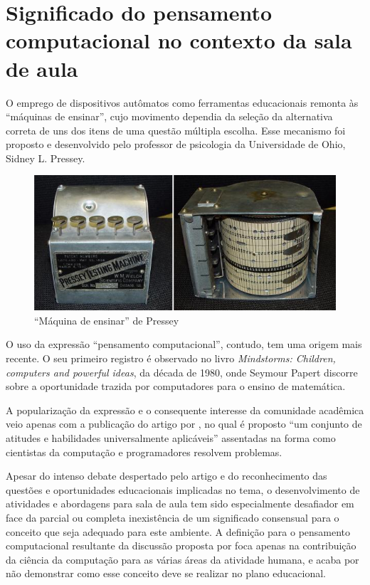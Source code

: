 \section{Significado do pensamento computacional no contexto da sala de aula}\label{significado-pensamento-computacional}

O emprego de dispositivos autômatos como ferramentas educacionais remonta às ``máquinas de ensinar'', cujo movimento dependia da seleção da alternativa correta de uns dos itens de uma questão múltipla escolha. Esse mecanismo foi proposto e desenvolvido pelo professor de psicologia da Universidade de Ohio,  Sidney L. Pressey.

\begin{figure}[!htb]
	\caption{``Máquina de ensinar'' de Pressey}
	\begin{center}
	    \includegraphics[scale=0.7]{imagens/pressey}
	\end{center}
	\label{fig:pressey}
\end{figure}

O uso da expressão ``pensamento computacional'', contudo, tem uma origem mais recente. O seu primeiro registro é observado no livro \textit{Mindstorms: Children, computers and powerful ideas}, da década de 1980, onde Seymour Papert discorre sobre a oportunidade trazida por computadores para o ensino de matemática. 

A popularização da expressão e o consequente interesse da comunidade acadêmica veio apenas com a publicação do artigo por , no qual é proposto ``um conjunto de atitudes e habilidades universalmente aplicáveis'' assentadas na forma como cientistas da computação e programadores resolvem problemas.

Apesar do intenso debate despertado pelo artigo e do reconhecimento das questões e oportunidades educacionais implicadas no tema, o desenvolvimento de atividades e abordagens para sala de aula tem sido especialmente desafiador em face da parcial ou completa inexistência de um significado consensual para o conceito que seja adequado para este ambiente. A definição para o pensamento computacional resultante da discussão proposta por  foca apenas na contribuição da ciência da computação para as várias áreas da atividade humana, e acaba por não demonstrar como esse conceito deve se realizar no plano educacional.

